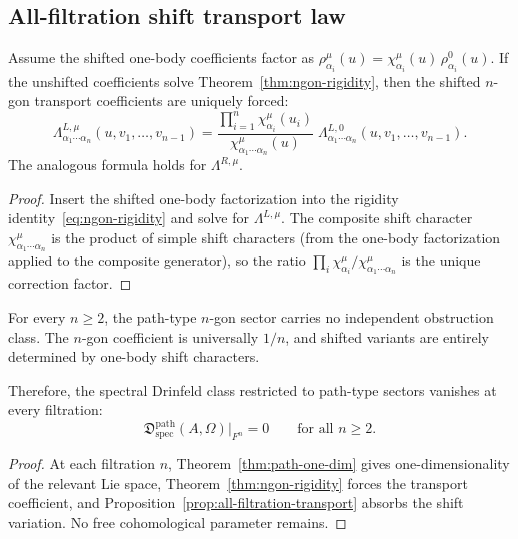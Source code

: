 \subsection{All-filtration shift transport law}

\begin{proposition}
\label{prop:all-filtration-transport}
Assume the shifted one-body coefficients factor as
$\rho_{\alpha_i}^{\mu}(u)=\chi_{\alpha_i}^{\mu}(u)\,
\rho_{\alpha_i}^{0}(u)$. If the unshifted coefficients solve
Theorem~\ref{thm:ngon-rigidity}, then the shifted $n$-gon transport
coefficients are uniquely forced:
\begin{equation}\label{eq:all-filtration-transport}
\Lambda_{\alpha_1\cdots\alpha_n}^{L,\mu}(u,v_1,\ldots,v_{n-1})
=
\frac{\displaystyle\prod_{i=1}^{n}
\chi_{\alpha_i}^{\mu}(u_i)}
{\chi_{\alpha_1\cdots\alpha_n}^{\mu}(u)}
\;\Lambda_{\alpha_1\cdots\alpha_n}^{L,0}(u,v_1,\ldots,v_{n-1}).
\end{equation}
The analogous formula holds for $\Lambda^{R,\mu}$.
\end{proposition}

\begin{proof}
Insert the shifted one-body factorization into the rigidity
identity~\eqref{eq:ngon-rigidity} and solve for $\Lambda^{L,\mu}$.
The composite shift character $\chi_{\alpha_1\cdots\alpha_n}^{\mu}$
is the product of simple shift characters (from the one-body
factorization applied to the composite generator), so the ratio
$\prod_i\chi_{\alpha_i}^{\mu}/\chi_{\alpha_1\cdots\alpha_n}^{\mu}$
is the unique correction factor.
\end{proof}

\begin{corollary}
\label{cor:all-filtration-no-obstruction}
For every $n\ge 2$, the path-type $n$-gon sector carries no
independent obstruction class. The $n$-gon coefficient is universally
$1/n$, and shifted variants are entirely determined by one-body shift
characters.

Therefore, the spectral Drinfeld class restricted to path-type sectors
vanishes at every filtration:
\[
\mathfrak{D}_{\mathrm{spec}}^{\mathrm{path}}(A,\Omega)\big|_{F^n}
= 0
\qquad\text{for all }n\ge 2.
\]
\end{corollary}

\begin{proof}
At each filtration $n$, Theorem~\ref{thm:path-one-dim} gives
one-dimensionality of the relevant Lie space,
Theorem~\ref{thm:ngon-rigidity} forces the transport coefficient,
and Proposition~\ref{prop:all-filtration-transport} absorbs the shift
variation. No free cohomological parameter remains.
\end{proof}

